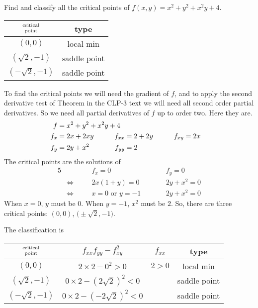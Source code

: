 \begin{question}
Find and classify all the critical points of $f(x,y)=x^2+y^2+x^2y+4$.
\end{question}

%

\begin{answer}
\renewcommand{\arraystretch}{1.3}
     \begin{tabular}{|c|c|}
     \hline
    $\Atop{\text{critical}}{\text{point}}$  & type \\  \hline
     $(0,0)$           &    local min  \\ \hline
     $(\sqrt{2},-1)$   & saddle point  \\ \hline
     $(-\sqrt{2},-1)$  & saddle point  \\ \hline
     \end{tabular}
\renewcommand{\arraystretch}{1.0}
\end{answer}

\begin{solution}
To find the critical points we will need the
gradient of $f$, and to apply the second derivative test of 
Theorem  in the CLP-3 text 
we will need all second order partial derivatives. So we need 
all partial derivatives of $f$ up to order two. Here they are.
\begin{alignat*}{5}
f&=x^2+y^2+x^2y+4 \hidewidth\\
f_x&=2x+2xy\qquad & f_{xx}&=2+2y\qquad & f_{xy}&= 2x\\
f_y&=2y+x^2 & f_{yy}&=2
\end{alignat*}
The critical points are the solutions of
\begin{alignat*}{5}
& & &f_x=0  & &f_y=0 \\
&\iff\quad & &2x(1+y)=0  & &2y+x^2=0 \\
&\iff & &x=0\text{ or }y=-1\qquad & &2y+x^2=0 
\end{alignat*}
When $x=0$, $y$ must be $0$. When $y=-1$, $x^2$ must be $2$.
So, there are three critical points: $(0,0)$, $\big(\pm\sqrt{2},-1\big)$.

The classification is
\begin{center}
\renewcommand{\arraystretch}{1.3}
     \begin{tabular}{|c|c|c|c|}
     \hline
    $\Atop{\text{critical}}{\text{point}}$  & $f_{xx}f_{yy}-f_{xy}^2$ & 
                                                          $f_{xx}$ & type 
\\  \hline
     $(0,0)$  &  $2\times 2-0^2>0$ &  $2>0$  & local min \\  \hline
     $(\sqrt{2},-1)$ & $0\times 2-(2\sqrt{2})^2<0$ &  & saddle point  \\ \hline
     $(-\sqrt{2},-1)$ & $0\times 2-(-2\sqrt{2})^2<0$ & & saddle point \\  \hline
     \end{tabular}
\renewcommand{\arraystretch}{1.0}
\end{center}

\end{solution}




